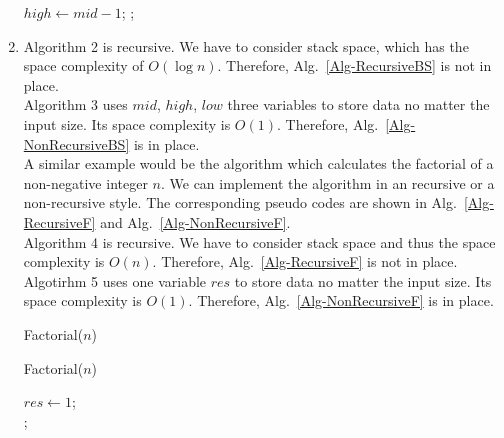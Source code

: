\documentclass[12pt,a4paper]{article}
\makeatletter
\newtheorem*{solution}{Solution}
\theoremstyle{definition}
\renewenvironment{solution}[1][Solution] {\par\pushQED{\qed}\normalfont\topsep6\p@\@plus6\p@\relax\trivlist\item[\hskip\labelsep\bfseries#1\@addpunct{.}]\ignorespaces}{\popQED\endtrivlist\@endpefalse} \makeatother
\makeatother
\begin{document}
\begin{enumerate}
\begin{minipage}[t]{0.455\textwidth}
\begin{algorithm}[H]
{	
	{
		$high \leftarrow mid - 1$;
	}
	}
	;
\end{algorithm}\end{minipage}
\begin{solution}
Algorithm 2 is recursive. We have to consider stack space, which has the space complexity of $O(\log n)$. Therefore, Alg.~\ref{Alg-RecursiveBS} is not in place.\\
Algorithm 3 uses $mid$, $high$, $low$ three variables to store data no matter the input size. Its space complexity is $O(1)$. Therefore, Alg.~\ref{Alg-NonRecursiveBS} is in place.\\
A similar example would be the algorithm which calculates the factorial of a non-negative integer $n$. We can implement the algorithm in an recursive or a non-recursive style. The corresponding pseudo codes are shown in Alg.~\ref{Alg-RecursiveF} and Alg.~\ref{Alg-NonRecursiveF}.\\
Algorithm 4 is recursive. We have to consider stack space and thus the space complexity is $O(n)$. Therefore, Alg.~\ref{Alg-RecursiveF} is not in place.\\
Algotirhm 5 uses one variable $res$ to store data no matter the input size. Its space complexity is $O(1)$. Therefore, Alg.~\ref{Alg-NonRecursiveF} is in place.

\end{solution}











\begin{minipage}[t]{0.49\textwidth}
\begin{algorithm}[H]
	\BlankLine
	\caption{Factorial($n$)} \label{Alg-RecursiveF}
	\BlankLine 
\end{algorithm}
\end{minipage}
\begin{minipage}[t]{0.455\textwidth}
\begin{algorithm}[H]
\BlankLine
	\caption{Factorial($n$)} \label{Alg-NonRecursiveF}
	\BlankLine	
	$res\leftarrow 1$;\\
	;
\end{algorithm}
\end{minipage}








\end{enumerate}
\end{document}
